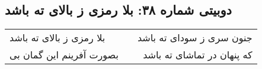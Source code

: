 \begin{center}
\section*{دوبیتی شماره ۳۸: بلا رمزی ز بالای ته باشد}
\label{sec:038}
\begin{longtable}{l p{0.5cm} r}
بلا رمزی ز بالای ته باشد
&&
جنون سری ز سودای ته باشد
\\
بصورت آفرینم این گمان بی
&&
که پنهان در تماشای ته باشد
\\
\end{longtable}
\end{center}
